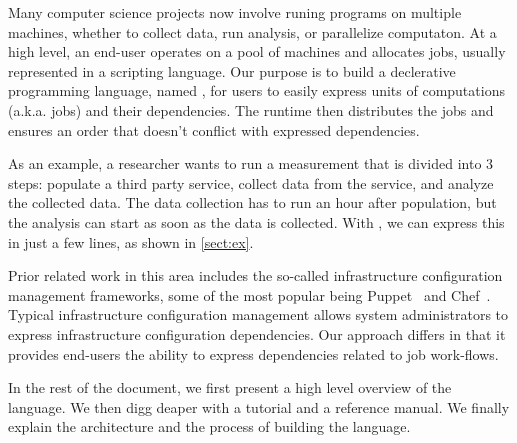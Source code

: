 
Many computer science projects now involve runing programs on multiple machines, whether to collect data, run analysis, or parallelize computaton.
At a high level, an end-user operates on a pool of machines and allocates jobs, usually represented in a scripting language.
Our purpose is to build a declerative programming language, named \lang{}, for users to easily express units of computations (a.k.a. jobs) and their dependencies.
The runtime then distributes the jobs and ensures an order that doesn't conflict with expressed dependencies.

As an example, a researcher wants to run a measurement that is divided into 3 steps: populate a third party service, collect data from the service, and analyze the collected data.
The data collection has to run an hour after population, but the analysis can start as soon as the data is collected.
With \lang{}, we can express this in just a few lines, as shown in \ref{sect:ex}.

Prior related work in this area includes the so-called infrastructure
configuration management frameworks, some of the most popular being
Puppet~\cite{puppet} and Chef~\cite{chef}. Typical infrastructure
configuration management allows system administrators to express
infrastructure configuration dependencies. Our approach differs in that
it provides end-users the ability to express dependencies related to
job work-flows.

In the rest of the document, we first present a high level overview of the language.
We then digg deaper with a tutorial and a reference manual.
We finally explain the architecture and the process of building the language.

